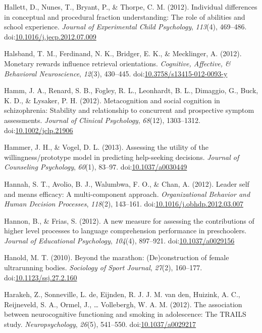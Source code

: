 \documentclass[english,man]{apa6}
\theoremstyle{definition}
\theoremstyle{definition}
\theoremstyle{definition}
\theoremstyle{remark}
\begin{document}
\hypertarget{ref-Hallett2012}{}
Hallett, D., Nunes, T., Bryant, P., \& Thorpe, C. M. (2012). Individual
differences in conceptual and procedural fraction understanding: The
role of abilities and school experience. \emph{Journal of Experimental
Child Psychology}, \emph{113}(4), 469--486.
doi:\href{https://doi.org/10.1016/j.jecp.2012.07.009}{10.1016/j.jecp.2012.07.009}

\hypertarget{ref-Halsband2012}{}
Halsband, T. M., Ferdinand, N. K., Bridger, E. K., \& Mecklinger, A.
(2012). Monetary rewards influence retrieval orientations.
\emph{Cognitive, Affective, \& Behavioral Neuroscience}, \emph{12}(3),
430--445.
doi:\href{https://doi.org/10.3758/s13415-012-0093-y}{10.3758/s13415-012-0093-y}

\hypertarget{ref-Hamm2012}{}
Hamm, J. A., Renard, S. B., Fogley, R. L., Leonhardt, B. L., Dimaggio,
G., Buck, K. D., \& Lysaker, P. H. (2012). Metacognition and social
cognition in schizophrenia: Stability and relationship to concurrent and
prospective symptom assessments. \emph{Journal of Clinical Psychology},
\emph{68}(12), 1303--1312.
doi:\href{https://doi.org/10.1002/jclp.21906}{10.1002/jclp.21906}

\hypertarget{ref-Hammer2013}{}
Hammer, J. H., \& Vogel, D. L. (2013). Assessing the utility of the
willingness/prototype model in predicting help-seeking decisions.
\emph{Journal of Counseling Psychology}, \emph{60}(1), 83--97.
doi:\href{https://doi.org/10.1037/a0030449}{10.1037/a0030449}

\hypertarget{ref-Hannah2012}{}
Hannah, S. T., Avolio, B. J., Walumbwa, F. O., \& Chan, A. (2012).
Leader self and means efficacy: A multi-component approach.
\emph{Organizational Behavior and Human Decision Processes},
\emph{118}(2), 143--161.
doi:\href{https://doi.org/10.1016/j.obhdp.2012.03.007}{10.1016/j.obhdp.2012.03.007}

\hypertarget{ref-Hannon2012}{}
Hannon, B., \& Frias, S. (2012). A new measure for assessing the
contributions of higher level processes to language comprehension
performance in preschoolers. \emph{Journal of Educational Psychology},
\emph{104}(4), 897--921.
doi:\href{https://doi.org/10.1037/a0029156}{10.1037/a0029156}

\hypertarget{ref-Hanold2010}{}
Hanold, M. T. (2010). Beyond the marathon: (De)construction of female
ultrarunning bodies. \emph{Sociology of Sport Journal}, \emph{27}(2),
160--177.
doi:\href{https://doi.org/10.1123/ssj.27.2.160}{10.1123/ssj.27.2.160}

\hypertarget{ref-Harakeh2012}{}
Harakeh, Z., Sonneville, L. de, Eijnden, R. J. J. M. van den, Huizink,
A. C., Reijneveld, S. A., Ormel, J., \ldots{} Vollebergh, W. A. M.
(2012). The association between neurocognitive functioning and smoking
in adolescence: The TRAILS study. \emph{Neuropsychology}, \emph{26}(5),
541--550. doi:\href{https://doi.org/10.1037/a0029217}{10.1037/a0029217}
\end{document}
